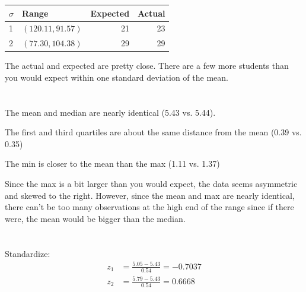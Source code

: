 \documentclass[letterpaper, landscape]{exam}
\begin{document}
\begin{description}
        \begin{tabular}[H]{llrr}
          \toprule
          $\sigma$ & Range             & Expected & Actual \\
          \midrule
          1         & $(120.11, 91.57)$ & 21       & 23 \\
          2         & $(77.30, 104.38)$ & 29       & 29 \\
          \bottomrule
        \end{tabular}

        The actual and expected are pretty close.  There are a few more students than you
        would expect within one standard deviation of the mean.  

      \pagebreak

      \item[48]
        \begin{parts}
          \part{} 
            \begin{itemize*}
              \item The mean and median are nearly identical (5.43 vs. 5.44).

              \item The first and third quartiles are about the same distance from the
                mean (0.39 vs. 0.35)

              \item The min is closer to the mean than the max (1.11 vs. 1.37) 
            \end{itemize*}

            Since the max is a bit larger than you would expect, the data seems asymmetric
            and skewed to the right.  However, since the mean and max are nearly
            identical, there can't be too many observations at the high end of the range
            since if there were, the mean would be bigger than the median.

        \part{}
          Standardize:
          \begin{align*}
            z_1 & = \frac{5.05 - 5.43}{0.54} = -0.7037 \\
            z_2 & = \frac{5.79 - 5.43}{0.54} = 0.6668 \\
          \end{align*}


\end{parts}
\end{description}
\end{document}
